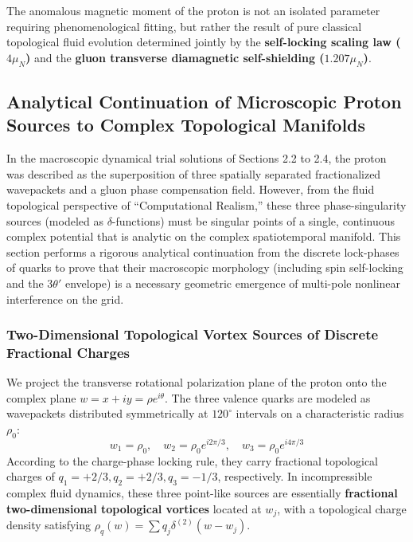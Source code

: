 \documentclass[12pt, a4paper]{article}
\begin{document}
The anomalous magnetic moment of the proton is not an isolated parameter requiring phenomenological fitting, but rather the result of pure classical topological fluid evolution determined jointly by the \textbf{self-locking scaling law ($4\mu_N$)} and the \textbf{gluon transverse diamagnetic self-shielding ($1.207\mu_N$)}.

\subsection{Analytical Continuation of Microscopic Proton Sources to Complex Topological Manifolds}

In the macroscopic dynamical trial solutions of Sections 2.2 to 2.4, the proton was described as the superposition of three spatially separated fractionalized wavepackets and a gluon phase compensation field. However, from the fluid topological perspective of ``Computational Realism,'' these three phase-singularity sources (modeled as $\delta$-functions) must be singular points of a single, continuous complex potential that is analytic on the complex spatiotemporal manifold. This section performs a rigorous analytical continuation from the discrete lock-phases of quarks to prove that their macroscopic morphology (including spin self-locking and the $3\theta'$ envelope) is a necessary geometric emergence of multi-pole nonlinear interference on the grid.

\subsubsection{Two-Dimensional Topological Vortex Sources of Discrete Fractional Charges}

We project the transverse rotational polarization plane of the proton onto the complex plane $w = x + iy = \rho e^{i\theta}$. The three valence quarks are modeled as wavepackets distributed symmetrically at $120^\circ$ intervals on a characteristic radius $\rho_0$:
\begin{equation}
w_1 = \rho_0, \quad w_2 = \rho_0 e^{i 2\pi/3}, \quad w_3 = \rho_0 e^{i 4\pi/3} \label{eq:complex_roots}
\end{equation}
According to the charge-phase locking rule, they carry fractional topological charges of $q_1 = +2/3, q_2 = +2/3, q_3 = -1/3$, respectively. In incompressible complex fluid dynamics, these three point-like sources are essentially \textbf{fractional two-dimensional topological vortices} located at $w_j$, with a topological charge density satisfying $\rho_q(w) = \sum q_j \delta^{(2)}(w - w_j)$.
\end{document}
